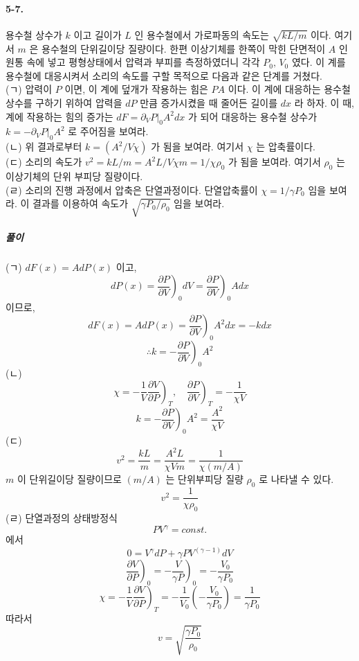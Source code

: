 \documentclass[a4paper,12pt]{report}
\newcommand{\Maxwell}[3][]{\left.\frac{\partial #2}{\partial #3} \right)_{#1} }
\begin{document}
	\paragraph{5-7. } 용수철 상수가 $k$ 이고 길이가 $L$ 인 용수철에서 가로파동의 속도는 $\sqrt{kL/m}$ 이다. 여기서 $m$ 은 용수철의 단위길이당 질량이다. 한편 이상기체를 한쪽이 막힌 단면적이 $A$ 인 원통 속에 넣고 평형상태에서 압력과 부피를 측정하였더니 각각 $P_0,\,V_0$ 였다. 이 계를 용수철에 대응시켜서 소리의 속도를 구할 목적으로 다음과 같은 단계를 거쳤다. \\
	(ㄱ) 압력이 $P$ 이면, 이 계에 덮개가 작용하는 힘은 $PA$ 이다. 이 계에 대응하는 용수철 상수를 구하기 위하여 압력을 $dP$ 만큼 증가시켰을 때 줄어든 길이를 $dx$ 라 하자. 이 때, 계에 작용하는 힘의 증가는 $dF=\partial_V P|_0A^2dx$ 가 되어 대응하는 용수철 상수가 $k=-\partial_V P|_0A^2$ 로 주어짐을 보여라. \\
	(ㄴ) 위 결과로부터 $k=(A^2/V\chi)$ 가 됨을 보여라. 여기서 $\chi$ 는 압축률이다. \\
	(ㄷ) 소리의 속도가 $v^2=kL/m=A^2L/V\chi m=1/\chi \rho_0$ 가 됨을 보여라. 여기서 $\rho_0$ 는 이상기체의 단위 부피당 질량이다. \\
	(ㄹ) 소리의 진행 과정에서 압축은 단열과정이다. 단열압축률이 $\chi=1/\gamma P_0$ 임을 보여라. 이 결과를 이용하여 속도가 $\sqrt{\gamma P_0/\rho_0}$ 임을 보여라.
	\subparagraph{풀이} (ㄱ) $dF(x)=AdP(x)$ 이고,
	$$dP(x)=\Maxwell[0]{P}{V}dV=\Maxwell[0]{P}{V}Adx$$
	이므로,
	$$dF(x)=AdP(x)=\Maxwell[0]{P}{V}A^2dx=-kdx$$
	$$\therefore k=-\Maxwell[0]{P}{V}A^2$$
	(ㄴ)
	$$\chi=-\frac{1}{V}\Maxwell[T]{V}{P},\quad \Maxwell[T]{P}{V}=-\frac{1}{\chi V}$$
	$$k=-\Maxwell[0]{P}{V}A^2=\frac{A^2}{\chi V}$$
	(ㄷ) 
	$$v^2=\frac{kL}{m}=\frac{A^2L}{\chi V m}=\frac{1}{\chi (m/A)}$$
	$m$ 이 단위길이당 질량이므로 $(m/A)$ 는 단위부피당 질량 $\rho_0$ 로 나타낼 수 있다. 
	$$v^2=\frac{1}{\chi \rho_0}$$
	(ㄹ) 단열과정의 상태방정식
	$$PV^{\gamma}=const.$$ 에서
	$$0= V^\gamma dP+\gamma PV^{(\gamma-1)}dV$$
	$$\Maxwell[0]{V}{P}=-\left.\frac{V}{\gamma P} \right)_0=-\frac{V_0}{\gamma P_0} $$
	$$\chi=-\frac{1}{V}\Maxwell[T]{V}{P}=-\frac{1}{V_0}\left(-\frac{V_0}{\gamma P_0} \right)=\frac{1}{\gamma P_0} $$
	따라서 
	$$v=\sqrt{\frac{\gamma P_0}{\rho_0}}$$
\end{document}
